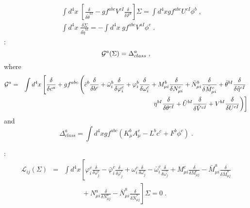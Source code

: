 \begin{appendix}
\begin{eqnarray}
&&
\int d^{4}x\; \left[ \frac{\delta}{\delta \tilde{\theta}^{aI}} - gf^{abc}V^{cI}\frac{\delta}{\delta F^{b}}\right] \Sigma= \int d^{4}x gf^{abc}U^{cI}\phi^{b}\;,
\\
&&
\int d^{4}x\; \frac{\delta \Sigma}{\delta \tilde{\eta}^{bI}} =-  \int d^{4}x\; gf^{abc}V^{aI}\phi^{c}  \;.
\end{eqnarray}
%
%
:
\begin{equation}
{\cal G}^{a}(\Sigma) = \Delta^{a}_{class}\;,
\end{equation}
where
\begin{eqnarray}
{\cal G}^{a} &=& \int d^{4}x \left[ \frac{\delta}{\delta c^{a}} + gf^{abc}\left( \bar{c}^{b}\frac{\delta}{\delta b^{c}} + \bar{\omega}^{b}_{i}\frac{\delta}{\delta \varphi^{c}_{i}} + \varphi^{b}_{i}\frac{\delta}{\delta\omega^{c}_{i}} + M^{b}_{\mu i}\frac{\delta}{\delta N^{c}_{\mu i}} + \bar{N}^{b}_{\mu i}\frac{\delta}{\delta \bar{M}^{c}_{\mu i}} +\tilde{\theta}^{bI}\frac{\delta}{\delta \tilde{\eta}^{cI}}
\right.
\right.
\nonumber \\
&&
\phantom{\int d^{4}x\,}  
\left.
\left.
\eta^{bI}\frac{\delta}{\delta \theta^{cI}} + \tilde{U}^{bI}\frac{\delta}{\delta \tilde{V}^{cI}} + V^{bI}\frac{\delta}{\delta U^{cI}}
\right)\right]
\end{eqnarray}
and
\begin{equation}
\Delta^{a}_{class} = \int d^{4}x gf^{abc}\left( K^{b}_{\mu}A^{c}_{\mu} - L^{b}c^{c} + F^{b}\phi^{c} \right)\;.
\end{equation}

:
\begin{eqnarray}
 \mathcal{L}_{ij}(\Sigma) &=&  \int d^{4}x \left[ 
 \varphi^{c}_{i}\frac{\delta}{\delta\varphi^{c}_{j}}
- \bar{\varphi}^{c}_{i}\frac{\delta }{\delta \bar{\varphi}^{c}_{j}}
+ \omega^{c}_{i}\frac{\delta}{\delta\omega^{c}_{j}}    
- \bar{\omega}^{c}_{i}\frac{\delta }{\delta \bar{\omega}^{c}_{j}}
+ M^{c}_{\mu i}\frac{\delta}{\delta{M}^{c}_{\mu j}}  
- \bar{M}^{a}_{\mu i}\frac{\delta }{\delta \bar{M}^{a}_{\mu j}}
 \right. 
\nonumber \\
&&
\left. 
\phantom{\int d^{4}x\,}  
+ N^{a}_{\mu i}\frac{\delta}{\delta{N}^{a}_{\mu j}}  
- \bar{N}^{a}_{\mu i}\frac{\delta }{\delta \bar{N}^{a}_{\mu j}}
\right]\Sigma = 0\;.
\end{eqnarray}




\end{appendix}
